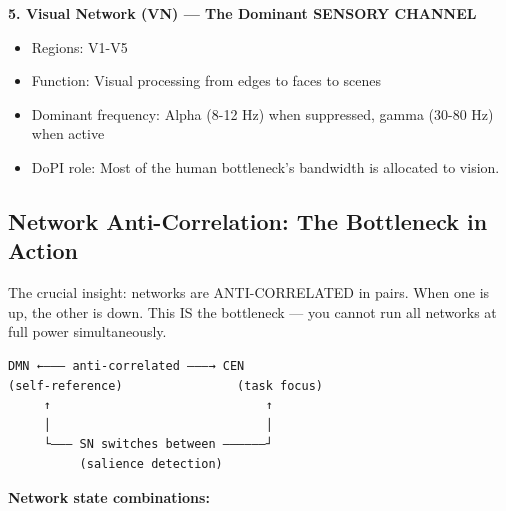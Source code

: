 \textbf{5. Visual Network (VN) — The Dominant SENSORY CHANNEL}

\begin{itemize}[nosep,leftmargin=*]
  \item Regions: V1-V5
  \item Function: Visual processing from edges to faces to scenes
  \item Dominant frequency: Alpha (8-12 Hz) when suppressed, gamma (30-80 Hz) when active
  \item DoPI role: Most of the human bottleneck's bandwidth is allocated to vision.
\end{itemize}


\subsection*{Network Anti-Correlation: The Bottleneck in Action}


The crucial insight: networks are ANTI-CORRELATED in pairs. When one is up, the other is down. This IS the bottleneck — you cannot run all networks at full power simultaneously.


\begin{verbatim}
DMN ←——— anti-correlated ———→ CEN
(self-reference)                (task focus)
     ↑                              ↑
     │                              │
     └——— SN switches between ——————┘
          (salience detection)
\end{verbatim}


\textbf{Network state combinations:}



